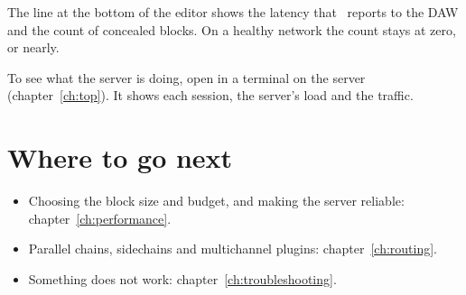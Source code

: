 The line at the bottom of the editor shows the latency that \fxme\ reports to
the DAW and the count of concealed blocks. On a healthy network the count
stays at zero, or nearly.

\begin{tip}
To see what the server is doing, open  in a terminal on the
server (chapter~\ref{ch:top}). It shows each session, the server's load and
the traffic.
\end{tip}

\section{Where to go next}

\begin{itemize}
  \item Choosing the block size and budget, and making the server
    reliable: chapter~\ref{ch:performance}.
  \item Parallel chains, sidechains and multichannel plugins:
    chapter~\ref{ch:routing}.
  \item Something does not work: chapter~\ref{ch:troubleshooting}.
\end{itemize}
